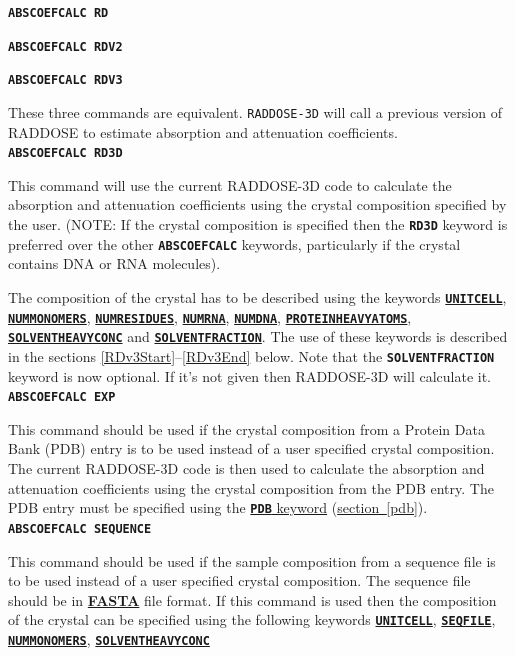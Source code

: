 \documentclass[a4paper]{article}
\newcommand{\RD}{\texttt{RADDOSE-3D}\xspace}
\newcommand{\Keyword}[1]{\texttt{\textbf{#1}}\xspace}
\newcommand{\SB}{\\[0.2em]}
\begin{document}
\noindent \Keyword{ABSCOEFCALC RD}

\noindent \Keyword{ABSCOEFCALC RDV2}

\noindent \Keyword{ABSCOEFCALC RDV3}

These three commands are equivalent. \RD will call a previous version of RADDOSE to estimate absorption and attenuation coefficients.\SB

\noindent \Keyword{ABSCOEFCALC RD3D}

This command will use the current RADDOSE-3D code to calculate the absorption and attenuation coefficients using the crystal composition specified by the user. (NOTE: If the crystal composition is specified then the \Keyword{RD3D} keyword is preferred over the other \Keyword{ABSCOEFCALC} keywords, particularly if the crystal contains DNA or RNA molecules).


The composition of the crystal has to be described using the keywords
 \hyperref[unitcell]{\Keyword{UNITCELL}},
 \hyperref[nummonomers]{\Keyword{NUMMONOMERS}},
 \hyperref[numresidues]{\Keyword{NUMRESIDUES}},
 \hyperref[numrna]{\Keyword{NUMRNA}},
 \hyperref[numdna]{\Keyword{NUMDNA}},
 \hyperref[proteinheavyatoms]{\Keyword{PROTEINHEAVYATOMS}},
 \hyperref[solventheavyconc]{\Keyword{SOLVENTHEAVYCONC}} and
 \hyperref[solventfraction]{\Keyword{SOLVENTFRACTION}}.
The use of these keywords is described in the sections \ref{RDv3Start}--\ref{RDv3End} below. Note that the \Keyword{SOLVENTFRACTION} keyword is now optional. If it's not given then RADDOSE-3D will calculate it.\SB

\noindent \Keyword{ABSCOEFCALC EXP}

This command should be used if the crystal composition from a Protein Data Bank (PDB) entry is to be used instead of a user specified crystal composition. The current RADDOSE-3D code is then used to calculate the absorption and attenuation coefficients using the crystal composition from the PDB entry. The PDB entry must be specified using the \hyperref[pdb]{\Keyword{PDB} keyword} (\hyperref[pdb]{section~\ref*{pdb}}).\SB

\noindent \Keyword{ABSCOEFCALC SEQUENCE}

This command should be used if the sample composition from a sequence file is to be used instead of a user specified crystal composition. The sequence file should be in \href{https://en.wikipedia.org/wiki/FASTA_format}{\textbf{FASTA}} file format. If this command is used then the composition of the crystal can be specified using the following keywords
\hyperref[unitcell]{\Keyword{UNITCELL}},
\hyperref[seqfile]{\Keyword{SEQFILE}},
\hyperref[nummonomers]{\Keyword{NUMMONOMERS}},
\hyperref[solventheavyconc]{\Keyword{SOLVENTHEAVYCONC}}
\SB
\end{document}
